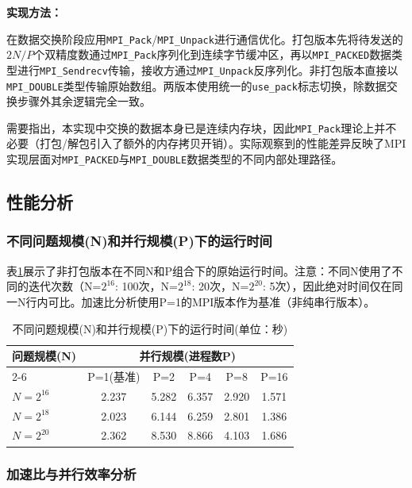 \documentclass{SYSUReport}
\begin{document}
\textbf{实现方法：}

在数据交换阶段应用\texttt{MPI\_Pack}/\texttt{MPI\_Unpack}进行通信优化。打包版本先将待发送的$2N/P$个双精度数通过\texttt{MPI\_Pack}序列化到连续字节缓冲区，再以\texttt{MPI\_PACKED}数据类型进行\texttt{MPI\_Sendrecv}传输，接收方通过\texttt{MPI\_Unpack}反序列化。非打包版本直接以\texttt{MPI\_DOUBLE}类型传输原始数组。两版本使用统一的\texttt{use\_pack}标志切换，除数据交换步骤外其余逻辑完全一致。

需要指出，本实现中交换的数据本身已是连续内存块，因此\texttt{MPI\_Pack}理论上并不必要（打包/解包引入了额外的内存拷贝开销）。实际观察到的性能差异反映了MPI实现层面对\texttt{MPI\_PACKED}与\texttt{MPI\_DOUBLE}数据类型的不同内部处理路径。

\subsection{性能分析}

\subsubsection{不同问题规模(N)和并行规模(P)下的运行时间}

表\ref{tab:runtime_results}展示了非打包版本在不同N和P组合下的原始运行时间。注意：不同N使用了不同的迭代次数（N=$2^{16}$: 100次，N=$2^{18}$: 20次，N=$2^{20}$: 5次），因此绝对时间仅在同一N行内可比。加速比分析使用P=1的MPI版本作为基准（非纯串行版本）。

\begin{table}[h!]
\centering
\caption{不同问题规模(N)和并行规模(P)下的运行时间(单位：秒)}
\label{tab:runtime_results}
\begin{tabular}{@{}lccccc@{}}
\toprule
\multirow{2}{*}{问题规模(N)} & \multicolumn{5}{c}{并行规模(进程数P)} \\
\cmidrule(l){2-6}
                              & P=1(基准) & P=2 & P=4 & P=8 & P=16 \\ \midrule
$N = 2^{16}$         & 2.237 & 5.282 & 6.357 & 2.920 & 1.571 \\
$N = 2^{18}$        & 2.023 & 6.144 & 6.259 & 2.801 & 1.386 \\
$N = 2^{20}$       & 2.362 & 8.530 & 8.866 & 4.103 & 1.686 \\
\bottomrule
\end{tabular}
\end{table}

\subsubsection{加速比与并行效率分析}
\end{document}
